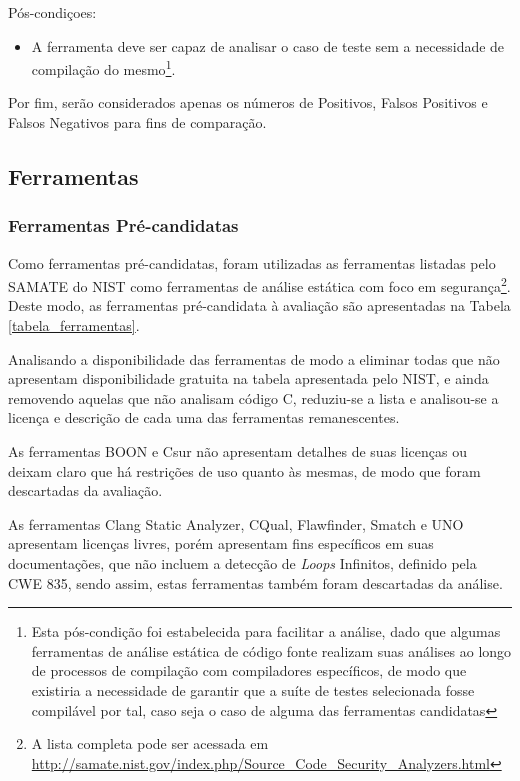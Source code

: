 Pós-condiçoes:
\begin{itemize}
  \item A ferramenta deve ser capaz de analisar o caso de teste sem a necessidade de compilação do mesmo\footnote{Esta pós-condição foi estabelecida para facilitar a análise, dado que algumas ferramentas de análise estática de código fonte realizam suas análises ao longo de processos de compilação com compiladores específicos, de modo que existiria a necessidade de garantir que a suíte de testes selecionada fosse compilável por tal, caso seja o caso de alguma das ferramentas candidatas}.
\end{itemize}

Por fim, serão considerados apenas os números de Positivos, Falsos Positivos e Falsos Negativos para fins de comparação.

\subsection{Ferramentas}

\subsubsection{Ferramentas Pré-candidatas}

Como ferramentas pré-candidatas, foram utilizadas as ferramentas listadas pelo SAMATE do NIST como ferramentas de análise estática com foco em segurança\footnote{A lista completa pode ser acessada em \url{http://samate.nist.gov/index.php/Source_Code_Security_Analyzers.html}}. Deste modo, as ferramentas pré-candidata à avaliação são apresentadas na Tabela \ref{tabela_ferramentas}.


Analisando a disponibilidade das ferramentas de modo a eliminar todas que não apresentam disponibilidade gratuita na tabela apresentada pelo NIST, e ainda removendo aquelas que não analisam código C, reduziu-se a lista e analisou-se a licença e descrição de cada uma das ferramentas remanescentes.

As ferramentas BOON e Csur não apresentam detalhes de suas licenças ou deixam claro que há restrições de uso quanto às mesmas, de modo que foram descartadas da avaliação.

As ferramentas Clang Static Analyzer, CQual, Flawfinder, Smatch e UNO apresentam licenças livres, porém apresentam fins específicos em suas documentações, que não incluem a detecção de \textit{Loops} Infinitos, definido pela CWE 835, sendo assim, estas ferramentas também foram descartadas da análise.

